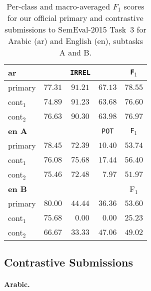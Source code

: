 \begin{table}%
\centering
\footnotesize
\begin{tabular}{|l|cccc|}
  \hline
  \bf ar	& \dir & \texttt{IRREL} & \rel & \texttt{F$_1$}\\  \hline  
  primary	& $77.31$ & $91.21$	& $67.13$	&  $78.55$ \\
  cont$_1$	& $74.89$ & $91.23$	& $63.68$	&  $76.60$ \\
  cont$_2$	& $76.63$ & $90.30$	& $63.98$	& $76.97$ \\  
  \hline \hline

  \bf en A	& \good   & \bad 	& \texttt{POT}	& \texttt{F$_1$}\\\hline
  primary	& $78.45$ & $72.39$	& $10.40$	& $53.74$ \\
  cont$_1$ 	& $76.08$ & $75.68$	& $17.44$	& $56.40$ \\
  cont$_2$ 	& $75.46$ & $72.48$ 	& $\,\,\,7.97$	& $51.97$ \\
\hline  \hline

\bf en B	& \yes	  & \no		& \unsure	& F$_1$	 \\
  \hline  
  primary	& $80.00$ & $44.44$	& $36.36$	& $53.60$ \\
  cont$_1$ 	& $75.68$ & $\,\,\,0.00$& $\,\,\,0.00$	& $25.23$ \\
  cont$_2$ 	& $66.67$ & $33.33$ 	& $47.06$	& $49.02$ \\
  \hline
 \end{tabular}
\caption{Per-class and macro-averaged $F_1$ scores for our official primary and 
contrastive submissions to SemEval-2015 Task~3 for Arabic (ar) and English 
(en), subtasks A and B.
\label{tab:results}}
\end{table}


\subsection{Contrastive Submissions}
\label{sub:contrastive}

\paragraph{Arabic.} 

